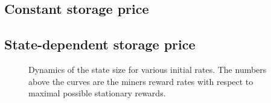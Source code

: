 \documentclass[]{llncs}   %
\begin{document}
\subsection{Constant storage price}
\subsection{State-dependent storage price}
\begin{figure}
    
    \caption{
        \label{fig:dynamics} Dynamics of the state size for various initial
        rates. The numbers above the curves are the miners reward rates with
        respect to maximal possible stationary rewards.
    }
\end{figure}
\end{document}
